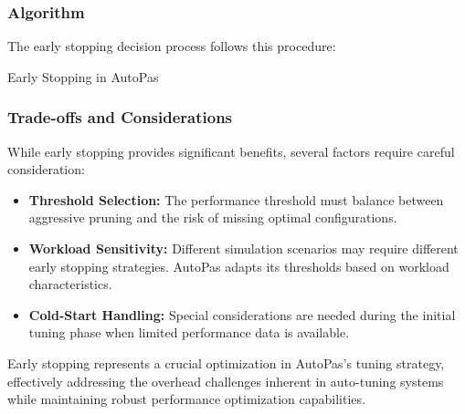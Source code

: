 \documentclass[conference]{IEEEtran}
\begin{document}
\subsubsection{Algorithm}
The early stopping decision process follows this procedure:


\begin{algorithm}[H]
    \caption{Early Stopping in AutoPas}
    \begin{algorithmic}[1]
        \Else
        \EndIf
        \EndFor
    \end{algorithmic}
\end{algorithm}

\subsubsection{Trade-offs and Considerations}
While early stopping provides significant benefits, several factors require careful consideration:

\begin{itemize}
    \item \textbf{Threshold Selection:} The performance threshold must balance between aggressive pruning and the risk of missing optimal configurations.

    \item \textbf{Workload Sensitivity:} Different simulation scenarios may require different early stopping strategies. AutoPas adapts its thresholds based on workload characteristics.

    \item \textbf{Cold-Start Handling:} Special considerations are needed during the initial tuning phase when limited performance data is available.
\end{itemize}

Early stopping represents a crucial optimization in AutoPas's tuning strategy, effectively addressing the overhead challenges inherent in auto-tuning systems while maintaining robust performance optimization capabilities.
\end{document}
